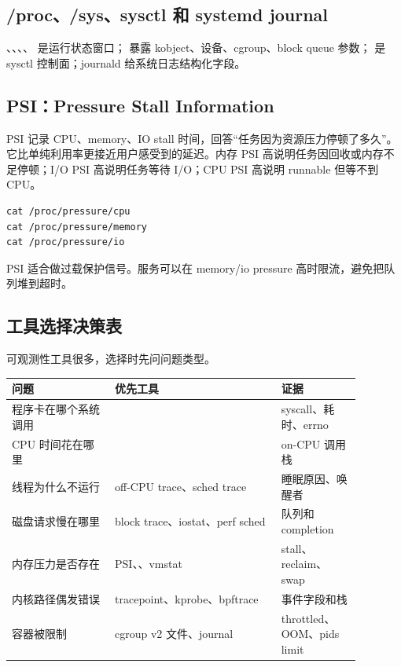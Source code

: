 \subsection{/proc、/sys、sysctl 和 systemd journal}

、、、、 是运行状态窗口； 暴露 kobject、设备、cgroup、block queue 参数； 是 sysctl 控制面；journald 给系统日志结构化字段。

\subsection{PSI：Pressure Stall Information}

PSI 记录 CPU、memory、IO stall 时间，回答“任务因为资源压力停顿了多久”。它比单纯利用率更接近用户感受到的延迟。内存 PSI 高说明任务因回收或内存不足停顿；I/O PSI 高说明任务等待 I/O；CPU PSI 高说明 runnable 但等不到 CPU。

\begin{lstlisting}
cat /proc/pressure/cpu
cat /proc/pressure/memory
cat /proc/pressure/io
\end{lstlisting}

PSI 适合做过载保护信号。服务可以在 memory/io pressure 高时限流，避免把队列堆到超时。

\subsection{工具选择决策表}

可观测性工具很多，选择时先问问题类型。

\begin{longtable}{|L{0.26\linewidth}|L{0.42\linewidth}|L{0.2\linewidth}|}
\toprule
问题 & 优先工具 & 证据 \\
\midrule
程序卡在哪个系统调用 &  & syscall、耗时、errno \\\tablerowrule
CPU 时间花在哪里 &  & on-CPU 调用栈 \\\tablerowrule
线程为什么不运行 & off-CPU trace、sched trace & 睡眠原因、唤醒者 \\\tablerowrule
磁盘请求慢在哪里 & block trace、iostat、perf sched & 队列和 completion \\\tablerowrule
内存压力是否存在 & PSI、、vmstat & stall、reclaim、swap \\\tablerowrule
内核路径偶发错误 & tracepoint、kprobe、bpftrace & 事件字段和栈 \\\tablerowrule
容器被限制 & cgroup v2 文件、journal & throttled、OOM、pids limit \\
\bottomrule
\end{longtable}

